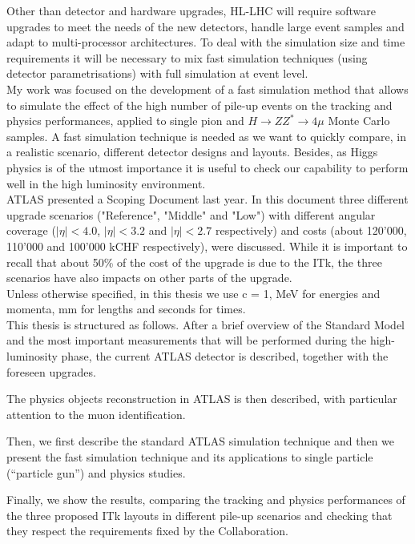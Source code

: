 \documentclass[a4paper,twoside,12pt]{book}
\begin{document}
Other than detector and hardware upgrades, HL-LHC will require software upgrades to meet the needs of the new detectors, handle large event samples and adapt to multi-processor
architectures. To deal with the simulation size and time requirements it will be necessary to mix fast simulation techniques (using detector parametrisations) with full simulation at event level.\\

My work was focused on the development of a fast simulation method that allows to simulate the effect of the high number of pile-up events on the tracking and physics performances, applied to single pion and $H \rightarrow ZZ^{*} \rightarrow 4\mu$ Monte Carlo samples. A fast simulation technique is needed as we want to quickly compare, in a realistic scenario, different detector
designs and layouts. Besides, as Higgs physics is of the utmost importance it is useful to check our capability to perform well in the high luminosity environment.\\

ATLAS presented a Scoping Document\cite{scoping} last year. In this document three different upgrade scenarios ("Reference", "Middle" and "Low") with different angular coverage 
($|\eta| < 4.0$, $|\eta| < 3.2$ and $|\eta| < 2.7$ respectively) and costs (about 120'000, 110'000 and 100'000 kCHF respectively),  were discussed. While it is important to recall that about 50\% of the cost of the upgrade is due to the ITk, the three scenarios have
also impacts on other parts of the upgrade.\\

Unless otherwise specified, in this thesis we use c = 1, MeV for energies and momenta, mm for lengths and seconds for times. \\

This thesis is structured as follows. 
After a brief overview of the Standard Model and 
the most important measurements that will be performed during the high-luminosity phase,
the current ATLAS detector is described, together with the foreseen upgrades.

The physics objects reconstruction in ATLAS is then described, with particular attention to the
muon identification.

Then, we first describe the standard ATLAS simulation technique and then we present
the fast simulation technique and its applications to single particle (``particle gun'') and physics studies.

Finally, we show the results, comparing the tracking and physics performances of the three proposed ITk layouts
in different pile-up scenarios and checking that they respect the requirements fixed by the
Collaboration.
\end{document}
